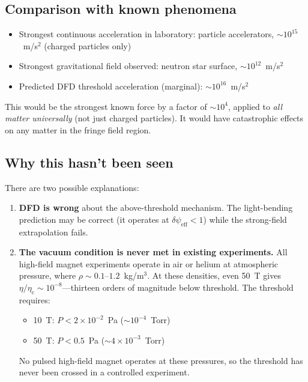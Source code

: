 \documentclass[12pt,a4paper]{article}
\newcommand{\psieff}{\psi_{\mathrm{eff}}}
\newcommand{\etac}{\eta_{\mathrm{c}}}
\begin{document}
\subsection{Comparison with known phenomena}

\begin{itemize}
\item Strongest continuous acceleration in laboratory: particle accelerators, $\sim 10^{15}$~m/s$^2$ (charged particles only)
\item Strongest gravitational field observed: neutron star surface, $\sim 10^{12}$~m/s$^2$
\item Predicted DFD threshold acceleration (marginal): $\sim 10^{16}$~m/s$^2$
\end{itemize}

This would be the strongest known force by a factor of $\sim 10^4$, applied to \emph{all matter universally}
(not just charged particles). It would have catastrophic effects on any matter in the fringe field region.

\subsection{Why this hasn't been seen}

There are two possible explanations:

\begin{enumerate}
\item \textbf{DFD is wrong} about the above-threshold mechanism. The light-bending prediction may be correct
      (it operates at $\delta\psieff < 1$) while the strong-field extrapolation fails.

\item \textbf{The vacuum condition is never met in existing experiments.} All high-field magnet experiments
      operate in air or helium at atmospheric pressure, where $\rho \sim 0.1$--$1.2$~kg/m$^3$.
      At these densities, even 50~T gives $\eta/\etac \sim 10^{-8}$---thirteen orders of magnitude
      below threshold. The threshold requires:
      \begin{itemize}
      \item 10~T: $P < 2 \times 10^{-2}$~Pa ($\sim 10^{-4}$~Torr)
      \item 50~T: $P < 0.5$~Pa ($\sim 4 \times 10^{-3}$~Torr)
      \end{itemize}
      No pulsed high-field magnet operates at these pressures, so the threshold has never been crossed
      in a controlled experiment.
\end{enumerate}
\end{document}
